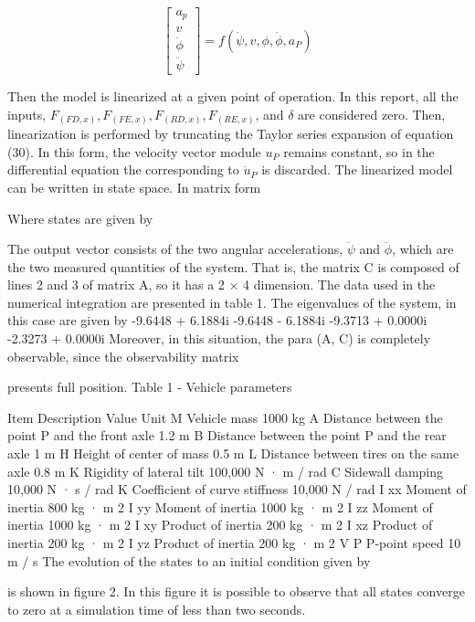 \documentclass[sublist,a4paper,twoside,11pt]{article}
\begin{document}
\begin{equation}
\begin{bmatrix} a_p\\ v\\ \ddot{\phi} \\ \ddot{\psi} \end{bmatrix}=f( \dot{\psi},v,\phi,\dot{\phi}, a_P )     
\end{equation}


Then the model is linearized at a given point of operation. In this report, all the inputs, $F_(FD,x), F_(FE,x), F_(RD,x), F_(RE,x)$, and $\delta$ are considered zero. Then, linearization is performed by truncating the Taylor series expansion of equation (30). In this form, the velocity vector module $u_P$ remains constant, so in the differential equation the corresponding to $\dot{u}_P$ is discarded.
The linearized model can be written in state space. In matrix form

Where states are given by

The output vector consists of the two angular accelerations, $\ddot{\psi}$ and $\ddot{\phi}$, which are the two measured quantities of the system. That is, the matrix C is composed of lines 2 and 3 of matrix A, so it has a 2 × 4 dimension.
The data used in the numerical integration are presented in table 1. The eigenvalues of the system, in this case are given by
-9.6448 + 6.1884i
-9.6448 - 6.1884i
-9.3713 + 0.0000i
-2.3273 + 0.0000i
Moreover, in this situation, the para (A, C) is completely observable, since the observability matrix

presents full position.
Table 1 - Vehicle parameters

Item Description Value Unit
M Vehicle mass 1000 kg
A Distance between the point P and the front axle 1.2 m
B Distance between the point P and the rear axle 1 m
H Height of center of mass 0.5 m
L Distance between tires on the same axle 0.8 m
K Rigidity of lateral tilt 100,000 N · m / rad
C Sidewall damping 10,000 N · s / rad
K Coefficient of curve stiffness 10,000 N / rad
I xx Moment of inertia 800 kg · m 2
I yy Moment of inertia 1000 kg · m 2
I zz Moment of inertia 1000 kg · m 2
I xy Product of inertia 200 kg · m 2
I xz Product of inertia 200 kg · m 2
I yz Product of inertia 200 kg · m 2
V P P-point speed 10 m / s
The evolution of the states to an initial condition given by

is shown in figure 2. In this figure it is possible to observe that all states converge to zero at a simulation time of less than two seconds.
\end{document}
